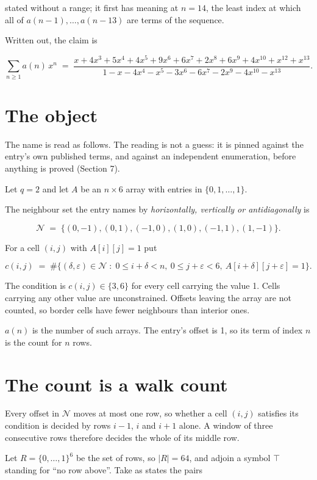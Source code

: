 \documentclass[11pt]{article}
\theoremstyle{definition}
\begin{document}
stated without a range; it first has meaning at $n = 14$, the least index at which all of $a(n-1),\dots,a(n-13)$ are terms of the sequence.

Written out, the claim is

\[\sum_{n \ge 1} a(n)\,x^n \;=\; \frac{x + 4x^{3} + 5x^{4} + 4x^{5} + 9x^{6} + 6x^{7} + 2x^{8} + 6x^{9} + 4x^{10} + x^{12} + x^{13}}{1 - x - 4x^{4} - x^{5} - 3x^{6} - 6x^{7} - 2x^{9} - 4x^{10} - x^{13}}.\]

\section{The object}

The name is read as follows. The reading is not a guess: it is pinned against the entry's own published terms, and against an independent enumeration, before anything is proved (Section 7).

Let $q = 2$ and let $A$ be an $n \times 6$ array with entries in $\{0,1,\dots,1\}$.

The neighbour set the entry names by {\itshape horizontally, vertically or antidiagonally} is

\[\mathcal{N} \;=\; \{(0,-1), (0,1), (-1,0), (1,0), (-1,1), (1,-1)\}.\]

For a cell $(i,j)$ with $A[i][j] = 1$ put

\[c(i,j) \;=\; \#\bigl\{(\delta,\varepsilon)\in\mathcal{N} \;:\; 0\le i+\delta<n,\ 0\le j+\varepsilon<6,\ A[i+\delta][j+\varepsilon] = 1\bigr\}.\]

The condition is $c(i,j) \in \{3, 6\}$ for every cell carrying the value 1. Cells carrying any other value are unconstrained. Offsets leaving the array are not counted, so border cells have fewer neighbours than interior ones.

$a(n)$ is the number of such arrays. The entry's offset is 1, so its term of index $n$ is the count for $n$ rows.

\section{The count is a walk count}

Every offset in $\mathcal{N}$ moves at most one row, so whether a cell $(i,j)$ satisfies its condition is decided by rows $i-1$, $i$ and $i+1$ alone. A window of three consecutive rows therefore decides the whole of its middle row.

Let $R = \{0,\dots,1\}^{6}$ be the set of rows, so $|R| = 64$, and adjoin a symbol $\top$ standing for ``no row above''. Take as states the pairs
\end{document}
